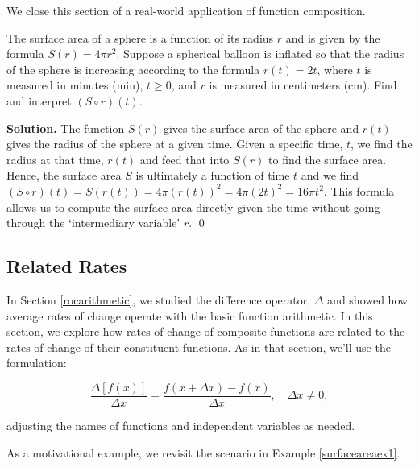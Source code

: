 \documentclass{ximera}
\begin{document}
We close this section of a real-world application of function composition.

\begin{ex}\label{surfaceareaex1}  The surface area of a sphere is a function of its radius $r$ and is given by the formula $S(r) = 4 \pi r^2$.    Suppose a spherical balloon is inflated so that the radius of the sphere is increasing according to the formula $r(t) = 2t$, where $t$ is measured in minutes (min), $t \geq 0$, and $r$ is measured in centimeters (cm).  Find and interpret $(S \circ r)(t)$.

\medskip

{\bf Solution.}  The function  $S(r)$ gives the surface area of the sphere and $r(t)$ gives the radius of the sphere at a given time.    Given a specific time, $t$, we find the radius at that time, $r(t)$ and feed that into $S(r)$ to find the surface area. Hence,  the surface area $S$ is ultimately a function of time $t$ and we find $(S \circ r)(t) = S(r(t)) = 4 \pi (r(t))^2 = 4 \pi \left(2t\right)^2 = 16 \pi t^{2}$.  This formula allows us to compute the surface area directly given the time without going through the `intermediary variable' $r$. \qed

\end{ex}

\subsection{Related Rates}
\label{RelatedRates}

In Section \ref{rocarithmetic}, we studied the difference operator, $\Delta$ and showed how average rates of change operate with the basic function arithmetic.  In this section, we explore how rates of change of composite functions are related to the rates of change of their constituent functions. As in that section, we'll use the formulation:

\[ \dfrac{\Delta[f(x)]}{\Delta x} = \dfrac{f(x+\Delta x)-f(x)}{\Delta x}, \quad \Delta x \neq 0,\]

 adjusting the names of functions and independent variables as needed. 
 
 
 \medskip
 
 As a motivational example, we revisit the scenario in  Example \ref{surfaceareaex1}.

\medskip
\end{document}
